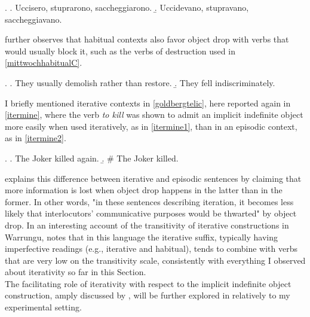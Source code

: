 \ex. \label{mittwoch4ita} \a. \label{mittwoch4ita1} Uccisero, stuprarono, saccheggiarono.
\b. \label{mittwoch4ita2} Uccidevano, stupravano, saccheggiavano.


\textcite[250]{Mittwoch2005} further observes that habitual contexts also favor object drop with verbs that would usually block it, such as the verbs of destruction used in \ref{mittwochhabitualC}.

\ex. \label{mittwochhabitualC} \a. \label{mittwochhabitual6} They usually demolish rather than restore.
\b. \label{mittwochhabitual7} They fell indiscriminately.

I briefly mentioned iterative contexts in \ref{goldbergtelic}, here reported again in \ref{itermine}, where the verb \textit{to kill} was shown to admit an implicit indefinite object more easily when used iteratively, as in \ref{itermine1}, than in an episodic context, as in \ref{itermine2}.

\ex. \label{itermine} \a. \label{itermine1} The Joker killed again.
\b. \label{itermine2} \# The Joker killed.

\textcite[5]{Glass2013} explains this difference between iterative and episodic sentences by claiming that more information is lost when object drop happens in the latter than in the former. In other words, "in these sentences describing iteration, it becomes less likely that interlocutors' communicative purposes would be thwarted" by object drop. In an interesting account of the transitivity of iterative constructions in Warrungu, \textcite[4-5]{Tsunoda1999} notes that in this language the iterative suffix, typically having imperfective readings (e.g., iterative and habitual), tends to combine with verbs that are very low on the transitivity scale, consistently with everything I observed about iterativity so far in this Section.\\
The facilitating role of iterativity with respect to the implicit indefinite object construction, amply discussed by \textcite{Goldberg2001}, will be further explored in  relatively to my experimental setting.


